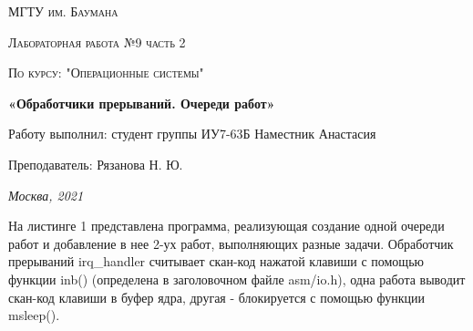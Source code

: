 \documentclass[12pt]{report}
\begin{document}
 
\begin{titlepage}
	\centering
	{\scshape\LARGE МГТУ им. Баумана \par}
	\vspace{3cm}
	{\scshape\Large Лабораторная работа №9 часть 2\par}
	\vspace{0.5cm}	
	{\scshape\Large По курсу: "Операционные системы"\par}
	\vspace{1.5cm}
	{\huge\bfseries «Обработчики прерываний. Очереди работ»\par}
	\vspace{2cm}
	\Large Работу выполнил: студент группы ИУ7-63Б Наместник Анастасия\par
	\vspace{0.5cm}
	\Large Преподаватель:  Рязанова Н. Ю.\par

	\vfill
	\large \textit {Москва, 2021} \par
\end{titlepage}

\newpage

На листинге 1 представлена программа, реализующая создание одной очереди работ и добавление в нее 2-ух работ, выполняющих разные задачи. Обработчик прерываний irq\_handler считывает скан-код нажатой клавиши с помощью функции inb() (определена в заголовочном файле asm/io.h), одна работа выводит скан-код клавиши в буфер ядра, другая - блокируется с помощью функции msleep().
\end{document}
